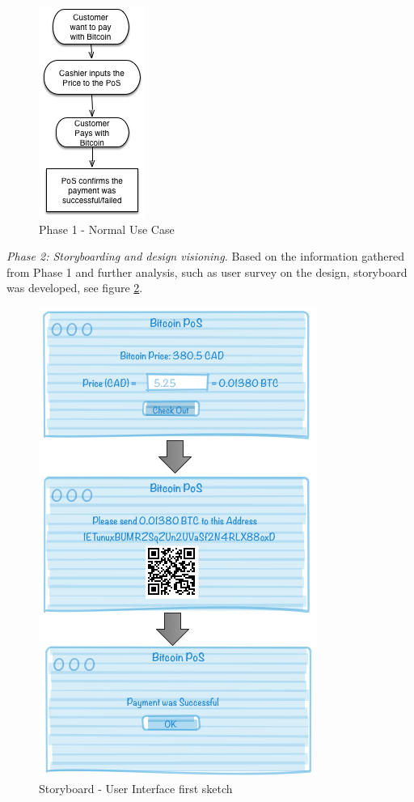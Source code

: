 \begin{figure}[htb!p]
\centering
\includegraphics[scale=0.7]{fig/RE_Scenario_Phase1.png}
  \caption{Phase 1 - Normal Use Case}
\label{fig:phase1}
\end{figure}


\textit{Phase 2: Storyboarding and design visioning.}
Based on the information gathered from Phase 1 and further analysis, such as user survey on the design, storyboard was developed, see figure \ref{fig:storyboard}.%

\begin{figure}[htb!p]
\centering
\includegraphics[scale=0.5]{fig/RE_Scenario_Interface.png}
  \caption{Storyboard - User Interface first sketch}
\label{fig:storyboard}
\end{figure}


